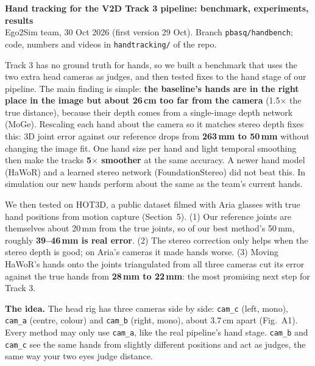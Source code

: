 \documentclass[10pt]{article}
\newcommand{\sect}[1]{\vspace{3pt}{\large\bfseries #1}\par\vspace{1pt}}
\newcommand{\good}[1]{\textbf{#1}}
\begin{document}
\pagestyle{plain}

{\LARGE\bfseries Hand tracking for the V2D Track 3 pipeline: benchmark, experiments, results}\\[2pt]
{\small Ego2Sim team, 30 Oct 2026 (first version 29 Oct). Branch \texttt{pbasq/handbench}; code, numbers and videos in
\texttt{handtracking/} of the repo.}

\sect{Summary}
Track 3 has no ground truth for hands, so we built a benchmark that uses the two extra head cameras as judges, and then
tested fixes to the hand stage of our pipeline. The main finding is simple: \good{the baseline's hands are in the right
place in the image but about 26\,cm too far from the camera} (1.5$\times$ the true distance), because their depth comes
from a single-image depth network (MoGe). Rescaling each hand about the camera so it matches stereo depth fixes this:
3D joint error against our reference drops from \good{263\,mm to 50\,mm} without changing the image fit. One hand size per
hand and light temporal smoothing then make the tracks \good{5$\times$ smoother} at the same accuracy. A newer hand model
(HaWoR) and a learned stereo network (FoundationStereo) did not beat this. In simulation our new hands perform about the
same as the team's current hands.

We then tested on HOT3D, a public dataset filmed with Aria glasses with true hand positions from motion capture
(Section~5). (1) Our reference joints are themselves about 20\,mm from the true joints, so of our best method's 50\,mm,
roughly \good{39--46\,mm is real error}. (2) The stereo correction only helps when the stereo depth is good; on Aria's
cameras it made hands worse. (3) Moving HaWoR's hands onto the joints triangulated from all three cameras cut its error
against the true hands from \good{28\,mm to 22\,mm}: the most promising next step for Track 3.

\sect{1. How we evaluate (the benchmark)}
\textbf{The idea.} The head rig has three cameras side by side: \texttt{cam\_c} (left, mono), \texttt{cam\_a} (centre,
colour) and \texttt{cam\_b} (right, mono), about 3.7\,cm apart (Fig.~A1). Every method may only use \texttt{cam\_a}, like
the real pipeline's hand stage. \texttt{cam\_b} and \texttt{cam\_c} see the same hands from slightly different positions
and act as judges, the same way your two eyes judge distance.
\end{document}
